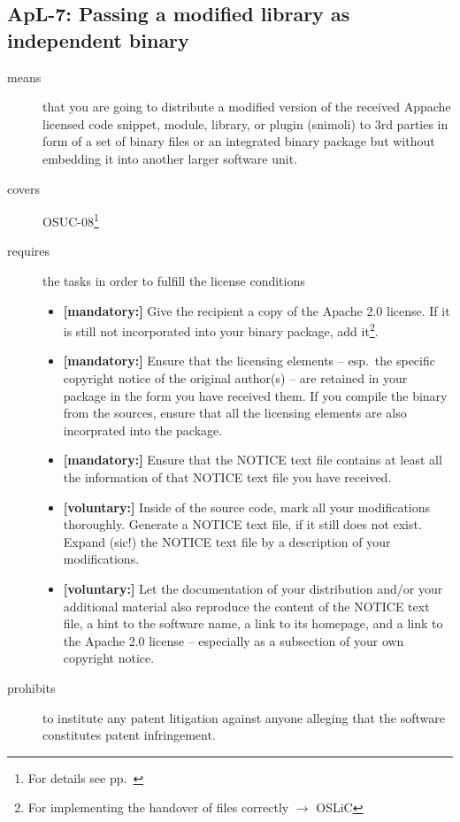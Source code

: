 \subsection{ApL-7: Passing a modified library as independent binary}

\begin{description}
\item[means] that you are going to distribute a modified version of the received
Appache licensed code snippet, module, library, or plugin (snimoli) to 3rd
parties in form of a set of binary files or an integrated binary package but
without embedding it into another larger software unit.
\item[covers] OSUC-08\footnote{For details see pp.\ \pageref{OSUC-08-DEF}}
\item[requires] the tasks in order to fulfill the license conditions
\begin{itemize}
  
 \item \textbf{[mandatory:]} Give the recipient a copy of the Apache 2.0
  license. If it is still not incorporated into your binary package, add
  it\footnote{For implementing the handover of files correctly $\rightarrow$
  OSLiC \pageref{DistributingFilesHint}}.
  
  \item \textbf{[mandatory:]} Ensure that the licensing elements -- esp.\ the
  specific copyright notice of the original author(s) -- are retained in your
  package in the form you have received them. If you compile the binary from the
  sources, ensure that all the licensing elements are also incorprated into the
  package.
  
  \item \textbf{[mandatory:]} Ensure that the NOTICE text file contains at least
  all the information of that NOTICE text file you have received.
   
  \item \textbf{[voluntary:]} Inside of the source code, mark all your
  modifications thoroughly. Generate a NOTICE text file, if it still does not
  exist. Expand (sic!) the NOTICE text file by a description of your
  modifications.
 
  \item \textbf{[voluntary:]} Let the documentation of your distribution
  and/or your additional material also reproduce the content of the NOTICE text
  file, a hint to the software name, a link to its homepage, and a link to the
  Apache 2.0 license -- especially as a subsection of your own copyright notice.
  
\end{itemize}

\item[prohibits] to institute any patent litigation against anyone alleging that
the software constitutes patent infringement.

\end{description}

